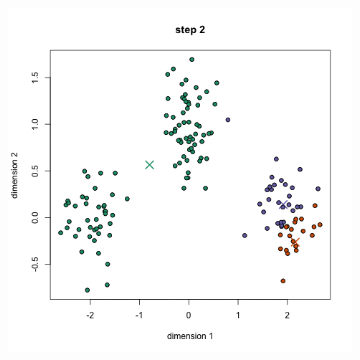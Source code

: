 \documentclass[a4paper, 14pt]{extarticle}
\begin{document}
\begin{figure}[h]
\begin{subfigure}[b]{0.3\textwidth}
		\caption{}
	\end{subfigure}
	~ 
	\begin{subfigure}[b]{0.3\textwidth}
		\includegraphics[width=\textwidth]{k_2}
		\caption{}
	\end{subfigure}
	~ 
	

\end{figure}
\end{document}
